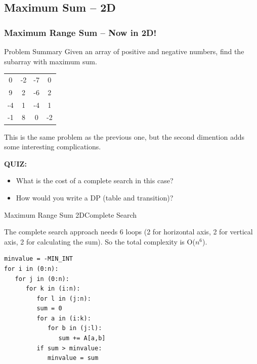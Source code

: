 \subsection{Maximum Sum -- 2D}
\begin{frame}
  \frametitle{Maximum Range Sum -- Now in 2D!}
  \begin{block}{Problem Summary}
    Given an array of positive and negative numbers, find the
    subarray with maximum sum.
  \end{block}
  \begin{center}
    \begin{tabular}{|cccc|}
      \hline
      0 & -2 & -7 & 0\\
      9 & 2 & -6 & 2\\
      -4 & 1 & -4 & 1\\
      -1 & 8 & 0 & -2\\
      \hline
    \end{tabular}
  \end{center}
  \bigskip

  This is the same problem as the previous one, but the second dimention adds some interesting complications.\bigskip

  {\bf QUIZ:}
  \begin{itemize}
    \item What is the cost of a complete search in this case?
    \item How would you write a DP (table and transition)?
  \end{itemize}
\end{frame}

\begin{frame}[fragile]{Maximum Range Sum 2D}{Complete Search}

\begin{block}{}
  The complete search approach needs 6 loops (2 for horizontal axis, 2 for vertical axis, 2 for calculating the sum). So the total complexity is O($n^6$).
\end{block}

\begin{block}{}
{\smaller
\begin{verbatim}
minvalue = -MIN_INT
for i in (0:n):
   for j in (0:n):
      for k in (i:n):
         for l in (j:n):
         sum = 0
         for a in (i:k):
            for b in (j:l):
               sum += A[a,b]
         if sum > minvalue:
            minvalue = sum
\end{verbatim}
}
\end{block}
\end{frame}

